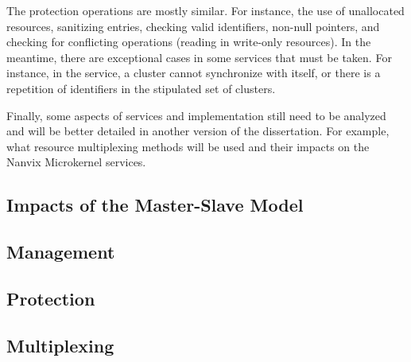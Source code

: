 
			The protection operations are mostly similar.
			For instance, the use of unallocated resources, sanitizing entries,
			checking valid identifiers, non-null pointers, and checking
			for conflicting operations (reading in write-only resources).
			In the meantime, there are exceptional cases in some services
			that must be taken.
			For instance, in the \sync service, a cluster cannot synchronize
			with itself, or there is a repetition of identifiers in the
			stipulated set of clusters.

			Finally, some aspects of services and implementation still need
			to be analyzed and will be better detailed in another version
			of the dissertation.
			For example, what resource multiplexing methods will be used
			and their impacts on the Nanvix Microkernel services.

		\subsection{Impacts of the Master-Slave Model}

		\subsection{Management}

		\subsection{Protection}

		\subsection{Multiplexing}
